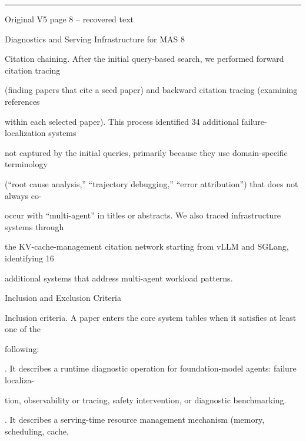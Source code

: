 \par\smallskip\noindent\rule{\textwidth}{0.4pt}\par{\sffamily\footnotesize Original V5 page 8 -- recovered text}\par\begin{flushleft}\footnotesize\ttfamily
\par\smallskip
\par\smallskip
\noindent Diagnostics and Serving Infrastructure for MAS 8\par
\par\smallskip
\par\smallskip
\par\smallskip
\noindent Citation chaining. After the initial query-based search, we performed forward citation tracing\par
\noindent (finding papers that cite a seed paper) and backward citation tracing (examining references\par
\noindent within each selected paper). This process identified 34 additional failure-localization systems\par
\noindent not captured by the initial queries, primarily because they use domain-specific terminology\par
\noindent (“root cause analysis,” “trajectory debugging,” “error attribution”) that does not always co-\par
\noindent occur with “multi-agent” in titles or abstracts. We also traced infrastructure systems through\par
\noindent the KV-cache-management citation network starting from vLLM and SGLang, identifying 16\par
\noindent additional systems that address multi-agent workload patterns.\par
\par\smallskip
{} Inclusion and Exclusion Criteria\par
\noindent Inclusion criteria. A paper enters the core system tables when it satisfies at least one of the\par
\noindent following:\par
{}. It describes a runtime diagnostic operation for foundation-model agents: failure localiza-\par
\noindent  tion, observability or tracing, safety intervention, or diagnostic benchmarking.\par
{}. It describes a serving-time resource management mechanism (memory, scheduling, cache,\par

\end{flushleft}
